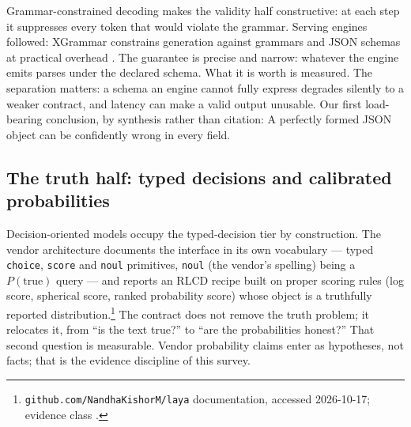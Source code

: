 Grammar-constrained decoding makes the validity half constructive: at each step it suppresses every
token that would violate the grammar.  Serving engines followed: XGrammar constrains generation
against grammars and JSON schemas at practical overhead \cite{xgrammar2024}. The guarantee is
precise and narrow: whatever the engine emits parses under the declared schema. What it is worth
is measured.  The separation matters: a schema an engine
cannot fully express degrades silently to a weaker contract, and latency can make a valid output
unusable. Our first load-bearing conclusion, by synthesis rather than citation:  A perfectly formed JSON object can be confidently wrong in every field.

\subsection{The truth half: typed decisions and calibrated probabilities}
\label{sec:l4-typeddecisions}

Decision-oriented models occupy the typed-decision tier by construction.  The vendor architecture documents the interface in its own vocabulary
--- typed \texttt{choice}, \texttt{score} and \texttt{noul} primitives, \texttt{noul} (the
vendor's spelling) being a
$P(\text{true})$ query --- and reports an RLCD recipe built on proper scoring rules (log score,
spherical score, ranked probability score) whose object is a truthfully reported
distribution.\footnote{\texttt{github.com/NandhaKishorM/laya}
documentation, accessed 2026-10-17; evidence class \evvendor{}.} The contract does not remove the
truth problem; it relocates it, from ``is the text true?'' to ``are the probabilities honest?''
That second question is measurable.  Vendor
probability claims enter as hypotheses, not facts; that is the evidence discipline of this survey.

